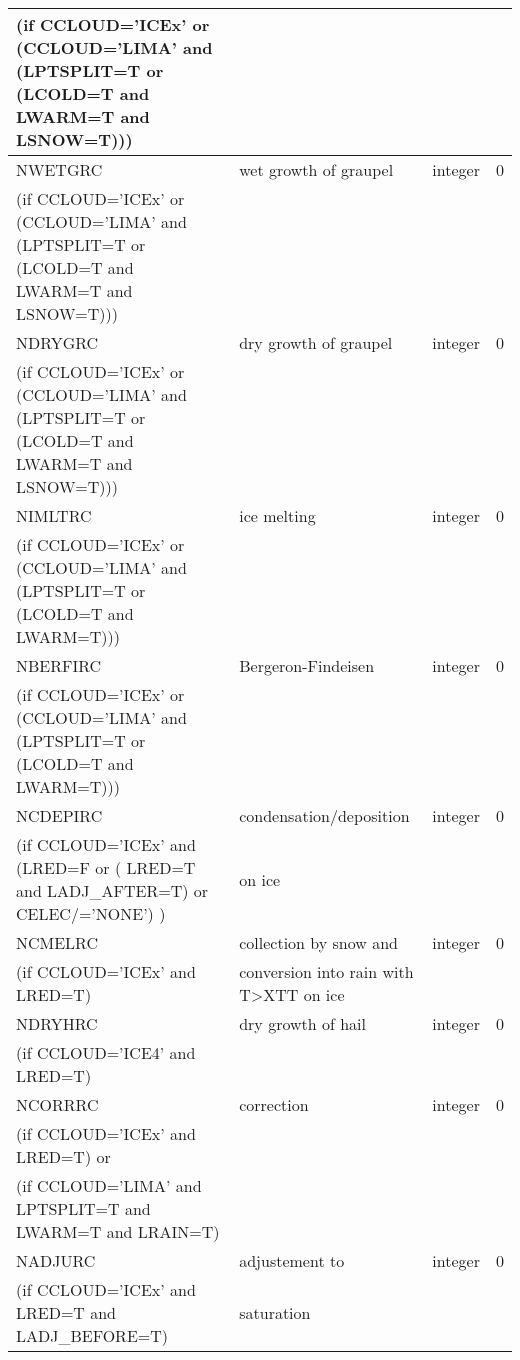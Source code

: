 \begin{longtable} {|p{}|p{}|>{\centering}p{}|p{}<{\centering}|}
(if CCLOUD='ICEx' or (CCLOUD='LIMA' and (LPTSPLIT=T or (LCOLD=T and LWARM=T and LSNOW=T))) & & & \\\hline
NWETGRC   & wet growth of graupel  & integer  &  0 \index{NWETGRC!\innam{NAM\_BU\_RRC}}\\ \nopagebreak
(if CCLOUD='ICEx' or (CCLOUD='LIMA' and (LPTSPLIT=T or (LCOLD=T and LWARM=T and LSNOW=T))) & & & \\\hline
NDRYGRC   & dry growth of graupel & integer  &  0 \index{NDRYGRC!\innam{NAM\_BU\_RRC}}\\ \nopagebreak
(if CCLOUD='ICEx' or (CCLOUD='LIMA' and (LPTSPLIT=T or (LCOLD=T and LWARM=T and LSNOW=T))) & & & \\\hline
NIMLTRC   & ice melting & integer  &  0 \index{NIMLTRC!\innam{NAM\_BU\_RRC}}\\ \nopagebreak
(if CCLOUD='ICEx' or (CCLOUD='LIMA' and (LPTSPLIT=T or (LCOLD=T and LWARM=T))) & &   &  \\\hline
NBERFIRC  & Bergeron-Findeisen & integer  &  0 \index{NBERFIRC!\innam{NAM\_BU\_RRC}}\\ \nopagebreak
(if CCLOUD='ICEx' or (CCLOUD='LIMA' and (LPTSPLIT=T or (LCOLD=T and LWARM=T))) & &   &  \\\hline
NCDEPIRC  & condensation/deposition & integer  &  0 \index{NDEPIRC!\innam{NAM\_BU\_RRC}}\\ \nopagebreak
(if CCLOUD='ICEx' and (LRED=F or ( LRED=T and LADJ\_AFTER=T) or CELEC/='NONE')  ) &on ice &   &  \\\hline
NCMELRC  & collection by snow and  & integer  &  0 \index{NCMELRC!\innam{NAM\_BU\_RRC}}\\ \nopagebreak
(if CCLOUD='ICEx' and LRED=T) & conversion into rain with T>XTT on ice &   &  \\\hline
NDRYHRC  & dry growth of hail & integer  &  0 \index{NDRYHRC!\innam{NAM\_BU\_RRC}}\\ \nopagebreak
(if CCLOUD='ICE4' and LRED=T) & &   &  \\\hline
NCORRRC  & correction & integer  &  0 \index{NCORRRC!\innam{NAM\_BU\_RRC}}\\ \nopagebreak
(if CCLOUD='ICEx' and LRED=T) or & &   &  \\ \nopagebreak
(if CCLOUD='LIMA' and LPTSPLIT=T and LWARM=T and LRAIN=T) & &   &  \\\hline
NADJURC  & adjustement to & integer  &  0 \index{NADJURC!\innam{NAM\_BU\_RRC}}\\ \nopagebreak
(if CCLOUD='ICEx' and LRED=T and LADJ\_BEFORE=T) &saturation &   &  \\\hline

\end{longtable}
